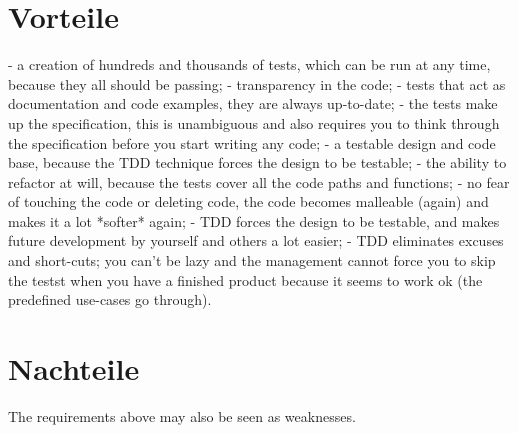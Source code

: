 \documentclass{mitschrift}
\newcommand{\bmn}{\marginpar{Benjamin\\Morgan}}
\begin{document}
\chapter{Vorteile}
\bmn

 - a creation of hundreds and thousands of tests, which can be run at any
   time, because they all should be passing;
 - transparency in the code;
 - tests that act as documentation and code examples, they are always
   up-to-date;
 - the tests make up the specification, this is unambiguous and also
   requires you to think through the specification before you start writing
   any code;
 - a testable design and code base, because the TDD technique forces the
   design to be testable;
 - the ability to refactor at will, because the tests cover all the code
   paths and functions;
 - no fear of touching the code or deleting code, the code becomes malleable
 (again) and makes it a lot *softer* again; \cite{UncleBob}
 - TDD forces the design to be testable, and makes future development by
   yourself and others a lot easier;
 - TDD eliminates excuses and short-cuts; you can't be lazy and the
   management cannot force you to skip the testst when you have a finished
   product because it seems to work ok (the predefined use-cases go
   through).

\chapter{Nachteile}
\bmn
The requirements above may also be seen as weaknesses.
\end{document}
